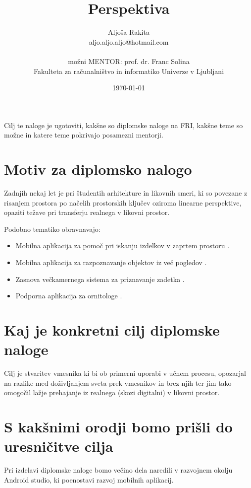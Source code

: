 \documentclass[11pt,a4paper]{article}
\title{Perspektiva}
\author{Aljoša Rakita\\
aljo.aljo.aljo@hotmail.com\\
\ \\
možni MENTOR:  prof. dr. Franc Solina  \\
Fakulteta za računalništvo in informatiko Univerze v Ljubljani
\date{\today}         
}
\begin{document}
\maketitle

Cilj te naloge je ugotoviti, kakšne so diplomske naloge na FRI, kakšne teme so možne in  katere teme pokrivajo posamezni mentorji.


\section{Motiv za diplomsko nalogo}

Zadnjih nekaj let je pri študentih arhitekture in likovnih smeri, ki so povezane z risanjem prostora po
načelih prostorskih ključev oziroma linearne perspektive, opaziti težave pri transferju realnega v
likovni prostor.

Podobno tematiko obravnavajo: 
\begin{itemize}

\item{Mobilna aplikacija za pomoč pri iskanju izdelkov v zaprtem prostoru} \cite{diploma1}.

\item{Mobilna aplikacija za razpoznavanje objektov iz več pogledov} \cite{diploma2}.

\item {Zasnova večkamernega sistema za priznavanje zadetka}  \cite{diploma3}.

\item {Podporna aplikacija za ornitologe}  \cite{diploma4}.


\end{itemize}

\section{Kaj je konkretni cilj diplomske naloge}

 Cilj je stvaritev vmesnika ki bi ob primerni uporabi v učnem
procesu, opozarjal na razlike med doživljanjem sveta prek vmesnikov in brez njih ter jim tako
omogočil lažje prehajanje iz realnega (skozi digitalni) v likovni prostor. 


\section{S kakšnimi orodji bomo prišli do uresničitve cilja}

Pri izdelavi diplomske naloge bomo večino dela naredili v razvojnem okolju Android studio, ki poenostavi razvoj mobilnih aplikacij.
\end{document}
